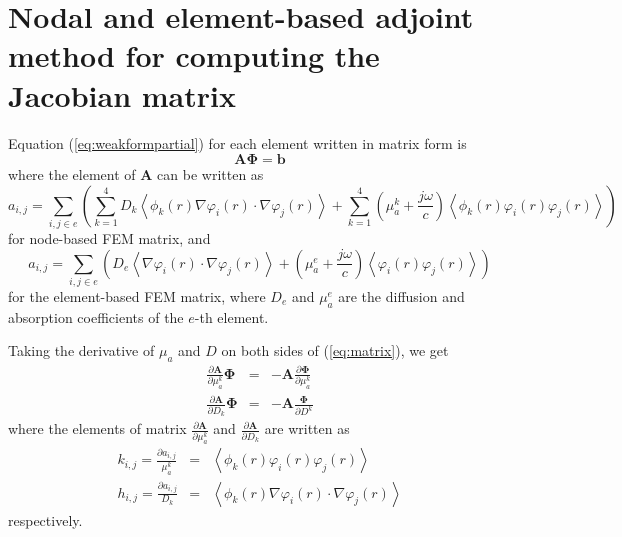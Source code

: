 \documentclass[12pt]{book}               %
\begin{document}
\section{Nodal and element-based adjoint method for computing the Jacobian matrix}
Equation (\ref{eq:weakformpartial}) for each element written in
matrix form is
\begin{equation}
\label{eq:matrix} \mathbf{A}{\boldsymbol\Phi}=\mathbf{b}
\end{equation}
where the element of $\mathbf{A}$ can be written as
\begin{equation}
a_{i,j}=\sum_{i,j\in e}\left(\sum_{k=1}^4D_k\left\langle
\phi_k(r)\nabla\varphi_i(r)\cdot\nabla\varphi_j(r)\right\rangle+\sum_{k=1}^4\left(\mu_{a}^k+\frac{j\omega}{c}\right)\left\langle\phi_k(r)\varphi_i(r)\varphi_j(r)\right\rangle\right)
\end{equation}
for node-based FEM matrix, and 
\begin{equation}
a_{i,j}=\sum_{i,j\in e}\left(D_e\left\langle
\nabla\varphi_i(r)\cdot\nabla\varphi_j(r)\right\rangle+\left(\mu_{a}^{e}+\frac{j\omega}{c}\right)\left\langle\varphi_i(r)\varphi_j(r)\right\rangle\right)
\end{equation}
for the element-based FEM matrix, where $D_e$ and $\mu_a^{e}$ are the diffusion and absorption coefficients 
of the $e$-th element.

Taking the derivative of $\mu_a$ and $D$ on both sides of
(\ref{eq:matrix}), we get
\begin{eqnarray}
\frac{\partial \mathbf{A}}{\partial
\mu_a^k}{\boldsymbol\Phi}&=&-\mathbf{A}\frac{\partial {\boldsymbol\Phi}}{\partial \mu_a^k}\\
\frac{\partial \mathbf{A}}{\partial
D_k}{\boldsymbol\Phi}&=&-\mathbf{A}\frac{\boldsymbol\Phi}{\partial
D^k}
\end{eqnarray}
where the elements of matrix $\frac{\partial \mathbf{A}}{\partial
\mu_a^k}$ and $\frac{\partial \mathbf{A}}{\partial D_k}$ are
written as
\begin{eqnarray}
k_{i,j}=\frac{\partial
a_{i,j}}{\mu_a^k}&=&\left\langle\phi_k(r)\varphi_i(r)\varphi_j(r)\right\rangle\\
h_{i,j}=\frac{\partial a_{i,j}}{D_k}&=&\left\langle
\phi_k(r)\nabla\varphi_i(r)\cdot\nabla\varphi_j(r)\right\rangle
\end{eqnarray}
respectively.
\end{document}
